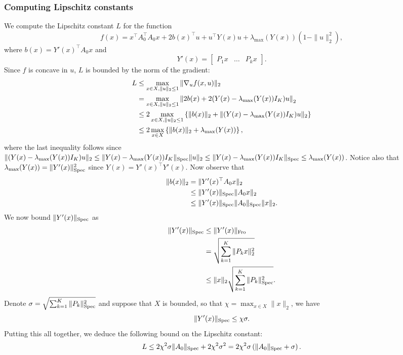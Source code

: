 \documentclass[11pt,oneside]{article}
\theoremstyle{plain}
\theoremstyle{definition}
\theoremstyle{remark}
\begin{document}
\subsubsection{Computing Lipschitz constants}

We compute the Lipschitz constant $L$ for the function
\[f(x) = x^\top A_0^\top A_0 x + 2 b(x)^\top u + u^\top Y(x) u + \lambda_{\max}(Y(x))(1 - \|u\|_2^2),\]
where $b(x) = Y'(x)^\top A_0 x$ and
\[ Y'(x) = \begin{bmatrix} P_1 x & \ldots & P_k x \end{bmatrix}. \]
Since $f$ is concave in $u$, $L$ is bounded by the norm of the gradient:
\begin{align*}
L &\leq \max_{x \in X, \|u\|_2 \leq 1} \|\nabla_u f(x,u)\|_2\\
&= \max_{x \in X, \|u\|_2 \leq 1} \left\| 2 b(x) + 2 (Y(x) - \lambda_{\max}(Y(x)) I_K) u \right\|_2\\
&\leq 2 \max_{x \in X, \|u\|_2 \leq 1} \left\{ \|b(x)\|_2  + \|(Y(x) - \lambda_{\max}(Y(x)) I_K) u\|_2 \right\}\\
&\leq 2 \max_{x \in X} \left\{ \|b(x)\|_2  + \lambda_{\max}(Y(x)) \right\},
\end{align*}
where the last inequality follows since $\|(Y(x) - \lambda_{\max}(Y(x)) I_K) u\|_2 \leq \|Y(x) - \lambda_{\max}(Y(x)) I_K\|_{\mathop{\hbox{\rm\scriptsize Spec}}} \|u\|_2 \leq \|Y(x) - \lambda_{\max}(Y(x)) I_K\|_{\mathop{\hbox{\rm\scriptsize Spec}}} \leq \lambda_{\max}(Y(x))$. Notice also that $\lambda_{\max}(Y(x)) = \|Y'(x)\|_{\mathop{\hbox{\rm\scriptsize Spec}}}^2$ since $Y(x) = Y'(x)^\top Y'(x)$. Now observe that
\begin{align*}
\|b(x)\|_2 &= \| Y'(x)^\top A_0 x \|_2\\
&\leq \|Y'(x)\|_{\mathop{\hbox{\rm\scriptsize Spec}}} \|A_0 x\|_2\\
&\leq \|Y'(x)\|_{\mathop{\hbox{\rm\scriptsize Spec}}} \|A_0\|_{\mathop{\hbox{\rm\scriptsize Spec}}} \|x\|_2.
\end{align*}
We now bound $\|Y'(x)\|_{\mathop{\hbox{\rm\scriptsize Spec}}}$ as
\begin{align*}
\|Y'(x)\|_{\mathop{\hbox{\rm\scriptsize Spec}}} &\leq \|Y'(x)\|_{\mathop{\hbox{\rm\scriptsize Fro}}}\\
&= \sqrt{\sum_{k=1}^K \|P_k x\|_2^2}\\
&\leq  \|x\|_2 \sqrt{\sum_{k=1}^K \|P_k\|_{\mathop{\hbox{\rm\scriptsize Spec}}}^2}.
\end{align*}
Denote $\sigma = \sqrt{\sum_{k=1}^K \|P_k\|_{\mathop{\hbox{\rm\scriptsize Spec}}}^2}$ and suppose that $X$ is bounded, so that $\chi = \max_{x \in X} \|x\|_2$, we have
\[ \|Y'(x)\|_{\mathop{\hbox{\rm\scriptsize Spec}}} \leq \chi \sigma. \]
Putting this all together, we deduce the following bound on the Lipschitz constant:
\[L \leq 2 \chi^2 \sigma \|A_0\|_{\mathop{\hbox{\rm\scriptsize Spec}}} + 2 \chi^2 \sigma^2 = 2 \chi^2 \sigma \left( \|A_0\|_{\mathop{\hbox{\rm\scriptsize Spec}}} + \sigma \right). \] 
\end{document}
